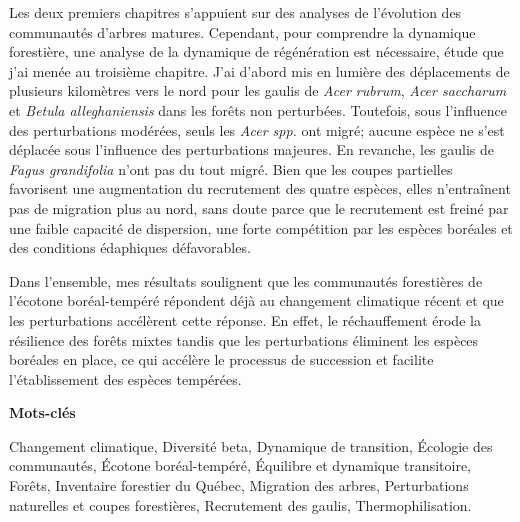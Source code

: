 Les deux premiers chapitres s'appuient sur des analyses de l'évolution
des communautés d'arbres matures. Cependant, pour comprendre la
dynamique forestière, une analyse de la dynamique de régénération est
nécessaire, étude que j'ai menée au troisième chapitre. J'ai d'abord mis
en lumière des déplacements de plusieurs kilomètres vers le nord pour
les gaulis de \emph{Acer rubrum}, \emph{Acer saccharum} et \emph{Betula
alleghaniensis} dans les forêts non perturbées. Toutefois, sous
l'influence des perturbations modérées, seuls les \emph{Acer spp.} ont
migré; aucune espèce ne s'est déplacée sous l'influence des
perturbations majeures. En revanche, les gaulis de \emph{Fagus
grandifolia} n'ont pas du tout migré. Bien que les coupes partielles
favorisent une augmentation du recrutement des quatre espèces, elles
n'entraînent pas de migration plus au nord, sans doute parce que le
recrutement est freiné par une faible capacité de dispersion, une forte
compétition par les espèces boréales et des conditions édaphiques
défavorables.

Dans l'ensemble, mes résultats soulignent que les communautés
forestières de l'écotone boréal-tempéré répondent déjà au changement
climatique récent et que les perturbations accélèrent cette réponse. En
effet, le réchauffement érode la résilience des forêts mixtes tandis que
les perturbations éliminent les espèces boréales en place, ce qui
accélère le processus de succession et facilite l'établissement des
espèces tempérées.

\vspace{1cm}

\textbf{Mots-clés}

Changement climatique, Diversité beta, Dynamique de transition, Écologie
des communautés, Écotone boréal-tempéré, Équilibre et dynamique
transitoire, Forêts, Inventaire forestier du Québec, Migration des
arbres, Perturbations naturelles et coupes forestières, Recrutement des
gaulis, Thermophilisation.
